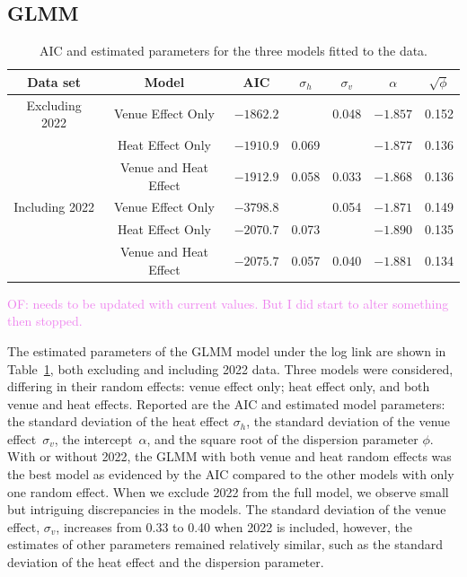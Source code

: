 \documentclass[12pt, letterpaper]{article}
\newcommand{\of}[1]{\textcolor{violet}{OF: #1}}
\begin{document}
\subsection{GLMM} \label{subsec:Results_GLMM}

\begin{table}
  \centering
  \caption{AIC and estimated parameters for the three models fitted to the
    data.}
  \label{tab:Gamma_parameters}
  \begin{tabular}{c c c c c c c}
    \toprule
    Data set & Model & AIC & $\sigma_h$ & $\sigma_v$ & $\alpha$ & $\sqrt{\phi}$ \\
    \midrule
    Excluding 2022 &
      Venue Effect Only & $-1862.2$ &   & 0.048 & $-1.857$ & 0.152\\
     & Heat Effect Only & $-1910.9$ & 0.069 &  & $-1.877$ & 0.136\\
     & Venue and Heat Effect & $-1912.9$ & 0.058 & 0.033 & $-1.868$ & 0.136\\[1ex]
    Including 2022 &
    Venue Effect Only & $-3798.8$ &   & 0.054 & $-1.871$ & 0.149\\
    & Heat Effect Only & $-2070.7$ & 0.073 &  & $-1.890$ & 0.135\\
    & Venue and Heat Effect & $-2075.7$ & 0.057 & 0.040 & $-1.881$ & 0.134\\
    \bottomrule
  \end{tabular}
\end{table}
\of{needs to be updated with current values. But I did start to alter something
then stopped.}

The estimated parameters of the GLMM model under the log link are shown in 
Table~\ref{tab:Gamma_parameters}, both excluding and including 2022 data.
Three models were considered, differing in their random effects: venue effect
only; heat effect only, and both venue and heat effects. Reported are the AIC
and estimated model parameters: the standard deviation
of the heat effect $\sigma_h$, the standard deviation of the venue
effect~$\sigma_v$, the intercept~$\alpha$, and the
square root of the dispersion parameter $\phi$. With or without 2022,
the GLMM with both venue and heat random effects was the best model as evidenced
by the AIC compared to the other models with only one random
effect.  When we exclude 2022 from the full model, we observe small but intriguing
discrepancies in the models. The standard deviation of the venue effect, 
$\sigma_v$, increases from 0.33 to 0.40 when 2022 is included, however, the
estimates of other parameters
remained relatively similar, such as the standard deviation of the heat effect
and the dispersion parameter.
\end{document}
